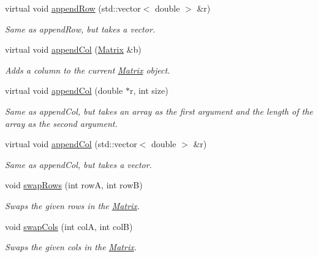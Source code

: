 \begin{DoxyCompactItemize}
virtual void \hyperlink{class_matrix_a934b0686d9a2b971e9740b9a29224a54}{appendRow} (std::vector$<$ double $>$ \&r)
\begin{DoxyCompactList}\small\item\em Same as appendRow, but takes a vector. \item\end{DoxyCompactList}\item 
virtual void \hyperlink{class_matrix_a6d7061bb02cf34f6c79a01ff25b41e84}{appendCol} (\hyperlink{class_matrix}{Matrix} \&b)
\begin{DoxyCompactList}\small\item\em Adds a column to the current \hyperlink{class_matrix}{Matrix} object. \item\end{DoxyCompactList}\item 
virtual void \hyperlink{class_matrix_aae8efe9de26740e3c953e43de55963b2}{appendCol} (double $\ast$r, int size)
\begin{DoxyCompactList}\small\item\em Same as appendCol, but takes an array as the first argument and the length of the array as the second argument. \item\end{DoxyCompactList}\item 
virtual void \hyperlink{class_matrix_a726f7ae83284c090af821752628974af}{appendCol} (std::vector$<$ double $>$ \&r)
\begin{DoxyCompactList}\small\item\em Same as appendCol, but takes a vector. \item\end{DoxyCompactList}\item 
void \hyperlink{class_matrix_ac0e73d5e98817e12b82a3f626c8343de}{swapRows} (int rowA, int rowB)
\begin{DoxyCompactList}\small\item\em Swaps the given rows in the \hyperlink{class_matrix}{Matrix}. \item\end{DoxyCompactList}\item 
void \hyperlink{class_matrix_a505f924baa7c236280751499da56ecee}{swapCols} (int colA, int colB)
\begin{DoxyCompactList}\small\item\em Swaps the given cols in the \hyperlink{class_matrix}{Matrix}. \item\end{DoxyCompactList}\item 

\end{DoxyCompactItemize}
